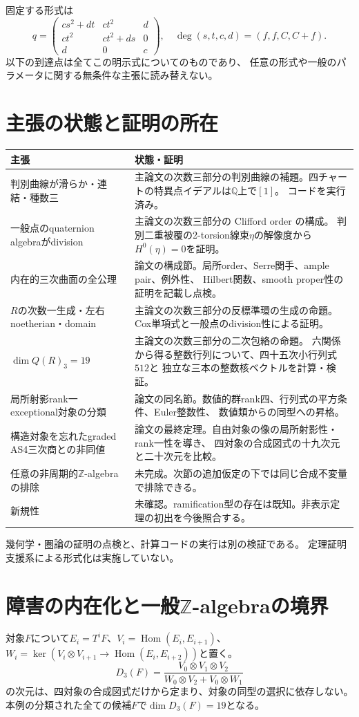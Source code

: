 \documentclass[11pt,a4paper]{ltjsarticle}
\begin{document}
固定する形式は
\[
q=\begin{pmatrix}cs^2+dt&ct^2&d\\ct^2&ct^2+ds&0\\d&0&c\end{pmatrix},
\quad
\deg(s,t,c,d)=(f,f,C,C+f).
\]
以下の到達点は全てこの明示式についてのものであり、
任意の形式や一般のパラメータに関する無条件な主張に読み替えない。

\section{主張の状態と証明の所在}
\begin{longtable}{p{.36\linewidth}p{.55\linewidth}}
\toprule
主張&状態・証明\\\midrule
判別曲線が滑らか・連結・種数三&
主論文の次数三部分の判別曲線の補題。四チャートの特異点イデアルは$\mathbb Q$上で$[1]$。
コードを実行済み。\\
一般点のquaternion algebraがdivision&
主論文の次数三部分の Clifford order の構成。
判別二重被覆の2-torsion線束$\eta$の解像度から$H^0(\eta)=0$を証明。\\
内在的三次曲面の全公理&
論文の構成節。局所order、Serre関手、ample pair、例外性、
Hilbert関数、smooth proper性の証明を記載し点検。\\
$R$の次数一生成・左右noetherian・domain&
主論文の次数三部分の反標準環の生成の命題。Cox単項式と一般点のdivision性による証明。\\
$\dim Q(R)_3=19$&
主論文の次数三部分の二次包絡の命題。
六関係から得る整数行列について、四十五次小行列式$512$と
独立な三本の整数核ベクトルを計算・検証。\\
局所射影rank一exceptional対象の分類&
論文の同名節。数値的群rank四、行列式の平方条件、Euler整数性、
数値類からの同型への昇格。\\
構造対象を忘れたgraded AS4三次商との非同値&
論文の最終定理。自由対象の像の局所射影性・rank一性を導き、
四対象の合成図式の十九次元と二十次元を比較。\\
任意の非周期的$\mathbb Z$-algebraの排除&
未完成。次節の追加仮定の下では同じ合成不変量で排除できる。\\
新規性&
未確認。ramification型の存在は既知。非表示定理の初出を今後照合する。\\
\bottomrule
\end{longtable}
幾何学・圏論の証明の点検と、計算コードの実行は別の検証である。
定理証明支援系による形式化は実施していない。

\section{障害の内在化と一般$\mathbb Z$-algebraの境界}
対象$F$について$E_i=T^iF$、$V_i=\operatorname{Hom}(E_i,E_{i+1})$、
$W_i=\ker(V_i\otimes V_{i+1}\to\operatorname{Hom}(E_i,E_{i+2}))$と置く。
\[
D_3(F)=
\frac{V_0\otimes V_1\otimes V_2}
{W_0\otimes V_2+V_0\otimes W_1}
\]
の次元は、四対象の合成図式だけから定まり、対象の同型の選択に依存しない。
本例の分類された全ての候補$F$で$\dim D_3(F)=19$となる。
\end{document}
